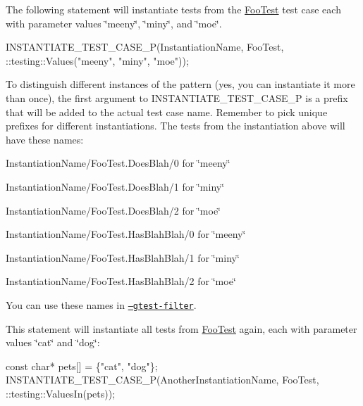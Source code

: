The following statement will instantiate tests from the {\ttfamily \hyperlink{class_foo_test}{Foo\+Test}} test case each with parameter values {\ttfamily \char`\"{}meeny\char`\"{}}, {\ttfamily \char`\"{}miny\char`\"{}}, and {\ttfamily \char`\"{}moe\char`\"{}}.


\begin{DoxyCode}
INSTANTIATE\_TEST\_CASE\_P(InstantiationName,
                        FooTest,
                        ::testing::Values("meeny", "miny", "moe"));
\end{DoxyCode}


To distinguish different instances of the pattern (yes, you can instantiate it more than once), the first argument to {\ttfamily I\+N\+S\+T\+A\+N\+T\+I\+A\+T\+E\+\_\+\+T\+E\+S\+T\+\_\+\+C\+A\+S\+E\+\_\+P} is a prefix that will be added to the actual test case name. Remember to pick unique prefixes for different instantiations. The tests from the instantiation above will have these names\+:


\begin{DoxyItemize}
\item {\ttfamily Instantiation\+Name/\+Foo\+Test.\+Does\+Blah/0} for {\ttfamily \char`\"{}meeny\char`\"{}}
\item {\ttfamily Instantiation\+Name/\+Foo\+Test.\+Does\+Blah/1} for {\ttfamily \char`\"{}miny\char`\"{}}
\item {\ttfamily Instantiation\+Name/\+Foo\+Test.\+Does\+Blah/2} for {\ttfamily \char`\"{}moe\char`\"{}}
\item {\ttfamily Instantiation\+Name/\+Foo\+Test.\+Has\+Blah\+Blah/0} for {\ttfamily \char`\"{}meeny\char`\"{}}
\item {\ttfamily Instantiation\+Name/\+Foo\+Test.\+Has\+Blah\+Blah/1} for {\ttfamily \char`\"{}miny\char`\"{}}
\item {\ttfamily Instantiation\+Name/\+Foo\+Test.\+Has\+Blah\+Blah/2} for {\ttfamily \char`\"{}moe\char`\"{}}
\end{DoxyItemize}

You can use these names in \href{#running-a-subset-of-the-tests}{\tt --gtest-\/filter}.

This statement will instantiate all tests from {\ttfamily \hyperlink{class_foo_test}{Foo\+Test}} again, each with parameter values {\ttfamily \char`\"{}cat\char`\"{}} and {\ttfamily \char`\"{}dog\char`\"{}}\+:


\begin{DoxyCode}
const char* pets[] = \{"cat", "dog"\};
INSTANTIATE\_TEST\_CASE\_P(AnotherInstantiationName, FooTest,
                        ::testing::ValuesIn(pets));
\end{DoxyCode}


